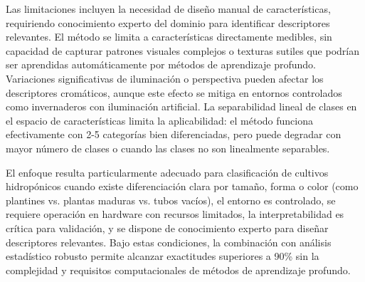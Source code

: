 Las limitaciones incluyen la necesidad de diseño manual de características, requiriendo conocimiento experto del dominio para identificar descriptores relevantes. El método se limita a características directamente medibles, sin capacidad de capturar patrones visuales complejos o texturas sutiles que podrían ser aprendidas automáticamente por métodos de aprendizaje profundo. Variaciones significativas de iluminación o perspectiva pueden afectar los descriptores cromáticos, aunque este efecto se mitiga en entornos controlados como invernaderos con iluminación artificial. La separabilidad lineal de clases en el espacio de características limita la aplicabilidad: el método funciona efectivamente con 2-5 categorías bien diferenciadas, pero puede degradar con mayor número de clases o cuando las clases no son linealmente separables.

El enfoque resulta particularmente adecuado para clasificación de cultivos hidropónicos cuando existe diferenciación clara por tamaño, forma o color (como plantines vs. plantas maduras vs. tubos vacíos), el entorno es controlado, se requiere operación en hardware con recursos limitados, la interpretabilidad es crítica para validación, y se dispone de conocimiento experto para diseñar descriptores relevantes. Bajo estas condiciones, la combinación con análisis estadístico robusto permite alcanzar exactitudes superiores a 90\% sin la complejidad y requisitos computacionales de métodos de aprendizaje profundo.
